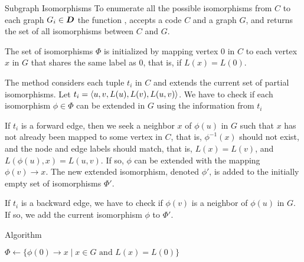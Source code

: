 \begin{frame}{Subgraph Isomorphisms}
To
enumerate all the possible isomorphisms from $C$ to each graph $G_i \in
{\boldsymbol D}$ the function \algISO,
accepts a code $C$ and a graph $G$, and
returns the set of all isomorphisms between $C$ and $G$.

\medskip
The set of isomorphisms $\Phi$ is initialized by mapping vertex $0$ in
$C$ to each vertex $x$ in $G$ that shares the same label as $0$, that is, if
$L(x) = L(0)$.

\medskip
The method considers each tuple $t_i$ in $C$ and extends the current set
of partial isomorphisms. Let $t_i = \langle u, v, L(u), L(v), L(u,v) \rangle$.
We have to check if each isomorphism $\phi \in \Phi$ can be extended in
$G$ using the information from $t_i$

\medskip
If $t_i$ is a forward edge, then
we seek a neighbor $x$ of $\phi(u)$ in $G$ such that $x$ has not already
been mapped to some vertex in $C$, that is,
$\phi^{-1}(x)$ should not exist, and
the node and edge labels should match, that is, $L(x) = L(v)$, and
$L(\phi(u),x) = L(u,v)$. If so, $\phi$ can be extended with the mapping
$\phi(v) \to x$. The new extended isomorphism, denoted $\phi'$, is added
to the initially empty set of isomorphisms $\Phi'$. 

\medskip
If $t_i$ is a
backward edge, we have to check if $\phi(v)$ is a neighbor of $\phi(u)$
in $G$. If so, we add the current isomorphism $\phi$ to $\Phi'$. 

\end{frame}




\begin{frame}[fragile]{Algorithm \algISO}
\small{
\begin{tightalgo}[H]{\textwidth-18pt}
  \ISO{}
  $\Phi \gets \{\phi(0) \to x \mid x \in G \text{ and } L(x)=L(0) \}$
  \;
  \Return{$\Phi$}
\end{tightalgo}
}
\end{frame}



